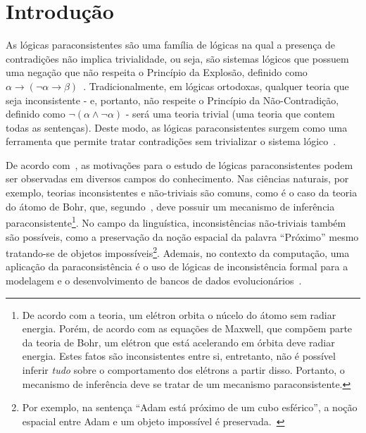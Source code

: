 \chapter{Introdução}
\label{cap:Introducao}


As lógicas paraconsistentes são uma família de lógicas na qual a presença de contradições não implica trivialidade, ou seja, são sistemas lógicos que possuem uma negação que não respeita o Princípio da Explosão, definido como $\alpha \rightarrow (\neg \alpha \rightarrow \beta)$~\cite{carnielli2007}. Tradicionalmente, em lógicas ortodoxas, qualquer teoria que seja inconsistente {-} e, portanto, não respeite o Princípio da Não-Contradição, definido como $\neg (\alpha \land \neg \alpha)$ {-} será uma teoria trivial (uma teoria que contem todas as sentenças). Deste modo, as lógicas paraconsistentes surgem como uma ferramenta que permite tratar contradições sem trivializar o sistema lógico~\cite{Carnielli_Coniglio_2016}.

De acordo com~, as motivações para o estudo de lógicas paraconsistentes podem ser observadas em diversos campos do conhecimento. Nas ciências naturais, por exemplo, teorias inconsistentes e não-triviais são comuns, como é o caso da teoria do átomo de Bohr, que, segundo~, deve possuir um mecanismo de inferência paraconsistente\footnote{De acordo com a teoria, um elétron orbita o núcelo do átomo sem radiar energia. Porém, de acordo com as equações de Maxwell, que compõem parte da teoria de Bohr, um elétron que está acelerando em órbita deve radiar energia. Estes fatos são inconsistentes entre si, entretanto, não é possível inferir \textit{tudo} sobre o comportamento dos elétrons a partir disso. Portanto, o mecanismo de inferência deve se tratar de um mecanismo paraconsistente.}. No campo da linguística, inconsistências não-triviais também são possíveis, como a preservação da noção espacial da palavra ``Próximo'' mesmo tratando-se de objetos impossíveis\footnote{Por exemplo, na sentença ``Adam está próximo de um cubo esférico'', a noção espacial entre Adam e um objeto impossível é preservada.~\cite{McGinnis2013-MCGTUA}}. Ademais, no contexto da computação, uma aplicação da paraconsistência é o uso de lógicas de inconsistência formal para a modelagem e o desenvolvimento de bancos de dados evolucionários~\cite{carnielli2000formal}.

